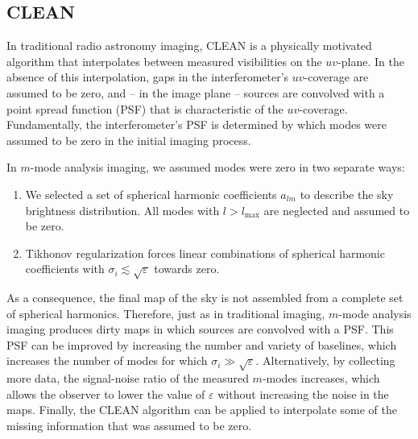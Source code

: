 \documentclass[twocolumn]{aastex61}
\begin{document}
\subsection{CLEAN}\label{sec:clean}

In traditional radio astronomy imaging, CLEAN \citep{1974A&AS...15..417H} is a physically motivated
algorithm that interpolates between measured visibilities on the $uv$-plane. In the absence of this
interpolation, gaps in the interferometer's $uv$-coverage are assumed to be zero, and -- in the
image plane -- sources are convolved with a point spread function (PSF) that is characteristic of
the $uv$-coverage.  Fundamentally, the interferometer's PSF is determined by which modes were
assumed to be zero in the initial imaging process.

In $m$-mode analysis imaging, we assumed modes were zero in two separate ways:
\begin{enumerate}
    \item We selected a set of spherical harmonic coefficients $a_{lm}$ to describe the sky
        brightness distribution. All modes with $l>l_\text{max}$ are neglected and assumed to be
        zero.
    \item Tikhonov regularization forces linear combinations of spherical harmonic coefficients with
        $\sigma_i \lesssim \sqrt{\varepsilon}$ towards zero.
\end{enumerate}
As a consequence, the final map of the sky is not assembled from a complete set of spherical
harmonics. Therefore, just as in traditional imaging, $m$-mode analysis imaging produces dirty maps
in which sources are convolved with a PSF.  This PSF can be improved by increasing the number and
variety of baselines, which increases the number of modes for which $\sigma_i \gg
\sqrt{\varepsilon}$.  Alternatively, by collecting more data, the signal-noise ratio of the measured
$m$-modes increases, which allows the observer to lower the value of $\varepsilon$ without
increasing the noise in the maps.  Finally, the CLEAN algorithm can be applied to interpolate some
of the missing information that was assumed to be zero.
\end{document}
